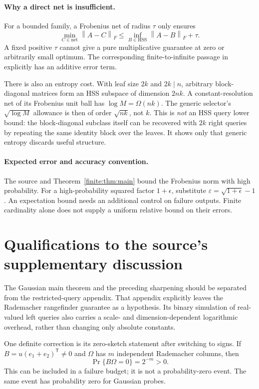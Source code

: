 \documentclass[11pt,oneside,openany,a4paper]{book}
\numberwithin{equation}{chapter}
\theoremstyle{definition}
\theoremstyle{remark}
\newcommand{\T}{\mathsf T}\newcommand{\Id}{I}
\newcommand{\F}[1]{\left\lVert#1\right\rVert_F}
\begin{document}
\paragraph{Why a direct net is insufficient.}
For a bounded family, a Frobenius net of radius $\tau$ only ensures
\[
\min_{C\in\text{net}}\F{A-C}
\le\inf_{B\in\mathrm{HSS}}\F{A-B}+\tau.
\]
A fixed positive $\tau$ cannot give a pure multiplicative guarantee at zero or arbitrarily small optimum. The corresponding finite-to-infinite passage in \cite{QESML} explicitly has an additive error term.

There is also an entropy cost. With leaf size $2k$ and $2k\mid n$, arbitrary block-diagonal matrices form an HSS subspace of dimension $2nk$. A constant-resolution net of its Frobenius unit ball has $\log M=\Omega(nk)$. The generic selector's $\sqrt{\log M}$ allowance is then of order $\sqrt{nk}$, not $k$. This is \emph{not} an HSS query lower bound: the block-diagonal subclass itself can be recovered with $2k$ right queries by repeating the same identity block over the leaves. It shows only that generic entropy discards useful structure.

\paragraph{Expected error and accuracy convention.}
The source and Theorem~\ref{finite:thm:main} bound the Frobenius norm with high probability. For a high-probability squared factor $1+\epsilon$, substitute $\varepsilon=\sqrt{1+\epsilon}-1$. An expectation bound needs an additional control on failure outputs. Finite cardinality alone does not supply a uniform relative bound on their errors.

\section{Qualifications to the source's supplementary discussion}
The Gaussian main theorem and the preceding sharpening should be separated from the restricted-query appendix. That appendix explicitly leaves the Rademacher rangefinder guarantee as a hypothesis. Its binary simulation of real-valued left queries also carries a scale- and dimension-dependent logarithmic overhead, rather than changing only absolute constants.

One definite correction is its zero-sketch statement after switching to signs. If $B=u(e_1+e_2)^\T\ne0$ and $\Omega$ has $m$ independent Rademacher columns, then
\[
\Pr\{B\Omega=0\}=2^{-m}>0.
\]
This can be included in a failure budget; it is not a probability-zero event. The same event has probability zero for Gaussian probes.
\end{document}
